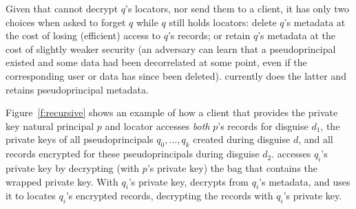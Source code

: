 %
Given that \sys cannot decrypt $q$'s locators, nor send them to a
client, it has only two choices when asked to forget $q$ while $q$
still holds locators: \one{} delete $q$'s metadata at the cost of losing
(efficient) access to $q$'s records; or \two{} retain $q$'s metadata at
the cost of slightly weaker security (an adversary can learn that a
pseudoprincipal existed and some data had been decorrelated at some point,
even if the corresponding user or data has since been deleted).
%
\sys currently does the latter and retains pseudoprincipal metadata.
%


%
Figure~\ref{f:recursive} shows an example of how a client that provides
the private key natural principal $p$ and locator  accesses
\emph{both} $p$'s records for disguise $d_1$, the private
keys of all pseudoprincipals ${q_0, \dots, q_k}$ created during disguise
$d$, and all records encrypted for these pseudoprincipals during disguise
$d_2$.
%
\sys accesses $q_i$'s private key by decrypting (with $p$'s private key) the
bag that contains the wrapped private key.
%
With $q_i$'s private key, \sys decrypts  from $q_i$'s metadata,
and uses it to locates $q_i$'s encrypted records, decrypting the records
with $q_i$'s private key.
%


